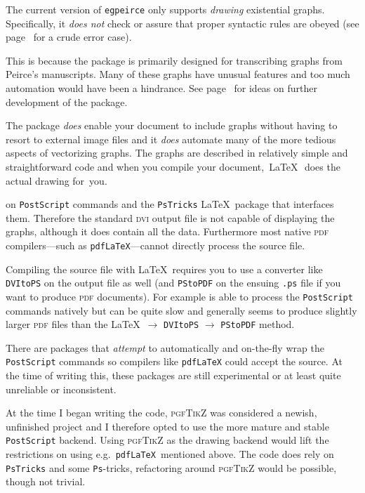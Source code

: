 \documentclass[a4paper,justified]{tufte-handout}
\begin{document}
The current version of \texttt{egpeirce} only supports \textit{drawing} existential graphs. Specifically, it \textit{does not} check or assure that proper syntactic rules are obeyed (see page~\pageref{cutscrossing} for a crude error case).

This is because the package is primarily designed for transcribing graphs from Peirce's manuscripts. Many of these graphs have unusual features and too much automation would have been a hindrance. See page~\pageref{furtherdevelopments} for ideas on further development of the package.

The package \textit{does} enable your document to include graphs without having to resort to external image files and it \textit{does} automate many of the more tedious aspects of vectorizing graphs. The graphs are described in relatively simple and straightforward code and when you compile your document, \,\LaTeX\ \,does the actual drawing for~you.

 on \texttt{PostScript} commands and the \texttt{PsTricks} \LaTeX\ package that interfaces them. Therefore the standard \textsc{dvi} output file is not capable of displaying the graphs, although it does contain all the data. Furthermore most native \textsc{pdf} compilers---such as \texttt{pdfLaTeX}---cannot directly process the source file.

Compiling the source file with \LaTeX\ requires you to use a converter like \texttt{DVItoPS} on the output file as well (and \texttt{PStoPDF} on the ensuing \texttt{.ps} file if you want to produce \textsc{pdf} documents). For example  is able to process the \texttt{PostScript} commands natively but can be quite slow and generally seems to produce slightly larger \textsc{pdf} files than the \LaTeX\ $\rightarrow$ \texttt{DVItoPS} $\rightarrow$ \texttt{PStoPDF} method.

There are packages that \textit{attempt} to automatically and on-the-fly wrap the \texttt{PostScript} commands so compilers like \texttt{pdfLaTeX} could accept the source. At the time of writing this, these packages are still experimental or at least quite unreliable or inconsistent.

At the time I began writing the code, \textsc{pgf}\kern-1pt{\footnotesize/}\textsc{TikZ} was considered a newish, unfinished project and I therefore opted to use the more mature and stable \texttt{PostScript} backend. Using \textsc{pgf}\kern-1pt{\footnotesize/}\textsc{TikZ} as the drawing backend would lift the restrictions on using e.g.\ \texttt{pdfLaTeX }mentioned above. The code does rely on \texttt{PsTricks} and some \texttt{Ps}-tricks, refactoring around \textsc{pgf}\kern-1pt{\footnotesize/}\textsc{TikZ} would be possible, though not trivial.
\end{document}

